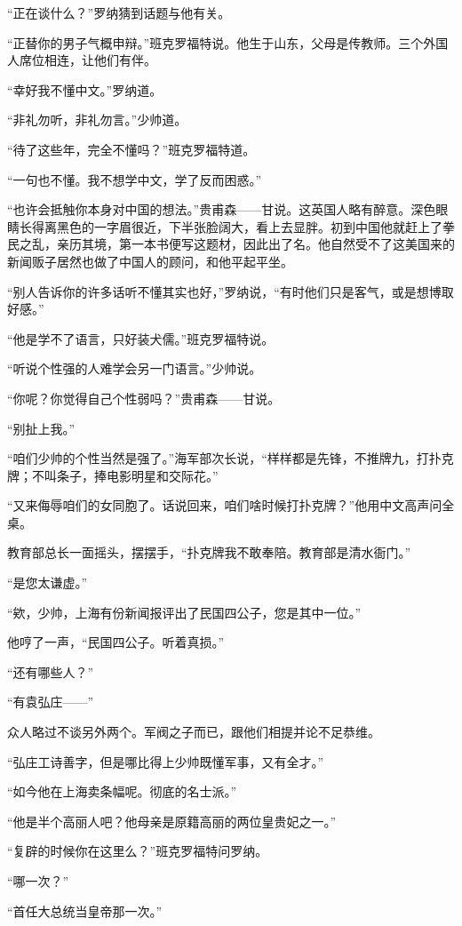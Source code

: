 \par “正在谈什么？”罗纳猜到话题与他有关。
\par “正替你的男子气概申辩。”班克罗福特说。他生于山东，父母是传教师。三个外国人席位相连，让他们有伴。
\par “幸好我不懂中文。”罗纳道。
\par “非礼勿听，非礼勿言。”少帅道。
\par “待了这些年，完全不懂吗？”班克罗福特道。
\par “一句也不懂。我不想学中文，学了反而困惑。”
\par “也许会抵触你本身对中国的想法。”贵甫森——甘说。这英国人略有醉意。深色眼睛长得离黑色的一字眉很近，下半张脸阔大，看上去显胖。初到中国他就赶上了拳民之乱，亲历其境，第一本书便写这题材，因此出了名。他自然受不了这美国来的新闻贩子居然也做了中国人的顾问，和他平起平坐。
\par “别人告诉你的许多话听不懂其实也好，”罗纳说，“有时他们只是客气，或是想博取好感。”
\par “他是学不了语言，只好装犬儒。”班克罗福特说。
\par “听说个性强的人难学会另一门语言。”少帅说。
\par “你呢？你觉得自己个性弱吗？”贵甫森——甘说。
\par “别扯上我。”
\par “咱们少帅的个性当然是强了。”海军部次长说，“样样都是先锋，不推牌九，打扑克牌；不叫条子，捧电影明星和交际花。”
\par “又来侮辱咱们的女同胞了。话说回来，咱们啥时候打扑克牌？”他用中文高声问全桌。
\par 教育部总长一面摇头，摆摆手，“扑克牌我不敢奉陪。教育部是清水衙门。”
\par “是您太谦虚。”
\par “欸，少帅，上海有份新闻报评出了民国四公子，您是其中一位。”
\par 他哼了一声，“民国四公子。听着真损。”
\par “还有哪些人？”
\par “有袁弘庄——”
\par 众人略过不谈另外两个。军阀之子而已，跟他们相提并论不足恭维。
\par “弘庄工诗善字，但是哪比得上少帅既懂军事，又有全才。”
\par “如今他在上海卖条幅呢。彻底的名士派。”
\par “他是半个高丽人吧？他母亲是原籍高丽的两位皇贵妃之一。”
\par “复辟的时候你在这里么？”班克罗福特问罗纳。
\par “哪一次？”
\par “首任大总统当皇帝那一次。”
